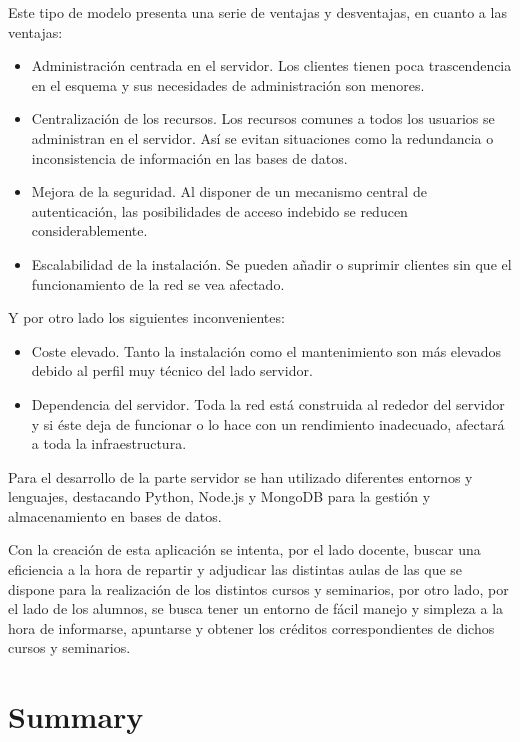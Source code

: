 \documentclass[a4paper, 12pt]{book}
\begin{document}
	Este tipo de modelo presenta una serie de ventajas y desventajas, en cuanto a las ventajas:
	\begin{itemize}
  \item Administración centrada en el servidor. Los clientes tienen poca trascendencia en el esquema y sus necesidades de administración son menores.
  \item Centralización de los recursos. Los recursos comunes a todos los usuarios se administran en el servidor. Así se evitan situaciones como la redundancia o inconsistencia de información en las bases de datos.
  \item Mejora de la seguridad. Al disponer de un mecanismo central de autenticación, las posibilidades de acceso indebido se reducen considerablemente.
  \item Escalabilidad de la instalación. Se pueden añadir o suprimir clientes sin que el funcionamiento de la red se vea afectado.
\end{itemize}

	Y por otro lado los siguientes inconvenientes:
	\begin{itemize}
  \item Coste elevado. Tanto la instalación como el mantenimiento son más elevados debido al perfil muy técnico del lado servidor.
  \item Dependencia del servidor. Toda la red está construida al rededor del servidor y si éste deja de funcionar o lo hace con un rendimiento inadecuado, afectará a toda la infraestructura.
\end{itemize}
	

	Para el desarrollo de la parte servidor se han utilizado diferentes entornos y lenguajes, destacando Python, Node.js y MongoDB para la gestión y almacenamiento en bases de datos.
	
	Con la creación de esta aplicación se intenta, por el lado docente, buscar una eficiencia a la hora de repartir y adjudicar las distintas aulas de las que se dispone para la realización de los distintos cursos y seminarios, por otro lado, por el lado de los alumnos, se busca tener un entorno de fácil manejo y simpleza a la hora de informarse, apuntarse y obtener los créditos correspondientes de dichos cursos y seminarios.


\chapter*{Summary}
\end{document}
